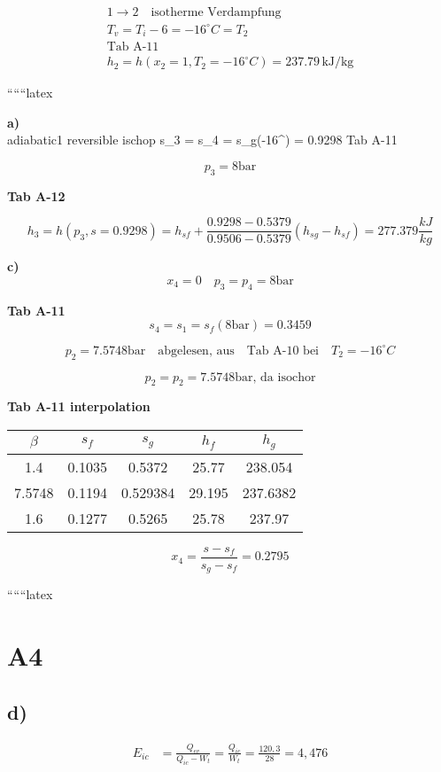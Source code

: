 \begin{align*}
    1 \rightarrow 2 \quad \text{isotherme Verdampfung} \\
    T_v = T_i - 6 = -16^\circ C = T_2 \\
    \text{Tab A-11} \\
    h_2 = h(x_2 = 1, T_2 = -16^\circ C) = 237.79 \, \text{kJ/kg}
\end{align*}

``````latex


\textbf{a)} \\
adiabatic1 reversible   \Rightarrow ischop \quad s_3 = s_4 = s_g(-16^\circ) = 0.9298 \quad Tab A-11

\[
p_3 = 8 \text{bar}
\]

\textbf{Tab A-12}  

\[
h_3 = h(p_3, s=0.9298) = h_{sf} + \frac{0.9298 - 0.5379}{0.9506 - 0.5379} (h_{sg} - h_{sf}) = 277.379 \frac{kJ}{kg}
\]

\textbf{c)} \\
\[
x_4 = 0 \quad p_3 = p_4 = 8 \text{bar}
\]

\textbf{Tab A-11} \\
\[
s_4 = s_1 = s_f(\text{8bar}) = 0.3459
\]

\[
p_2 = 7.5748 \text{bar} \quad \text{abgelesen, aus} \quad \text{Tab A-10 bei} \quad T_2 = -16^\circ C
\]

\[
p_2 = p_2 = 7.5748 \text{bar, da isochor}
\]

\textbf{Tab A-11 interpolation}

\begin{tabular}{|c|c|c|c|c|}
\hline
\(\beta\) & \(s_f\) & \(s_g\) & \(h_f\) & \(h_g\) \\
\hline
1.4 & 0.1035 & 0.5372 & 25.77 & 238.054 \\
7.5748 & 0.1194 & 0.529384 & 29.195 & 237.6382 \\
1.6 & 0.1277 & 0.5265 & 25.78 & 237.97 \\
\hline
\end{tabular}

\[
x_4 = \frac{s - s_f}{s_g - s_f} = 0.2795
\]

``````latex


\section*{A4}

\subsection*{d)}
\begin{align*}
    E_{ic} &= \frac{Q_{ev}}{Q_{ic} - W_t} = \frac{Q_{ic}}{W_t} = \frac{120,3}{28} = 4,476
\end{align*}

